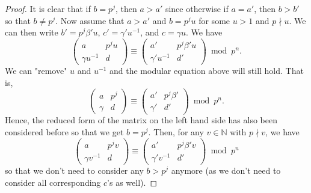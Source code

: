 \documentclass[letterpaper,12pt]{article}
\begin{document}
\begin{proof}
It is clear that if $b = p^j$, then $a > a'$ since
otherwise if $a = a'$, then $b > b'$ so that $b \neq p^j$.
Now assume that $a > a'$ and $b = p^j u $ 
for some $u > 1$ and $p \nmid u$.
We can then write $b' = p^j \beta' u$, $c' = \gamma' u^{-1}$, and 
$c = \gamma u$. We have 
\[
\begin{pmatrix} a & p^j u \\ \gamma u^{-1} & d \end{pmatrix}
\equiv \begin{pmatrix} a' & p^j \beta' u \\ \gamma' u^{-1} & d' \end{pmatrix} \bmod p^n.
\]
We can "remove" $u$ and $u^{-1}$ and the modular equation above will still hold.
That is,
\[
\begin{pmatrix} a & p^j \\ \gamma & d \end{pmatrix}
\equiv \begin{pmatrix} a' & p^j \beta'\\ \gamma' & d' \end{pmatrix} \bmod p^n.
\]
Hence, the reduced form of the matrix on the left hand side has also been considered before 
so that we get $b = p^j$.
Then, for any $v \in \mathbb{N}$ with $p \nmid v$, we have 
\[
\begin{pmatrix} a & p^jv \\ \gamma v^{-1} & d \end{pmatrix}
\equiv \begin{pmatrix} a' & p^j \beta'v\\ \gamma'v^{-1} & d' \end{pmatrix} \bmod p^n
\]
so that we don't need to consider any $b > p^j$ anymore
(as we don't need to consider all corresponding $c$'s as well).
\end{proof}

\
\end{document}
